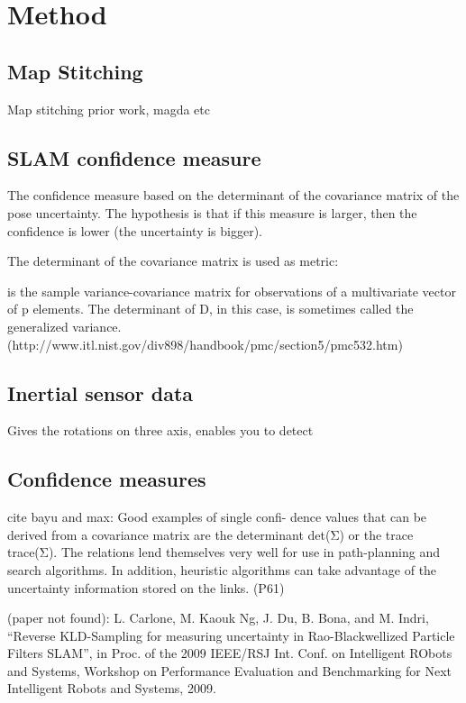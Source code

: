 \chapter{Method}
\section{Map Stitching}
Map stitching prior work, magda etc

\section{SLAM confidence measure}
The confidence measure based on the determinant of the covariance matrix of the pose uncertainty. The hypothesis is that if this measure is larger, then the confidence is lower (the uncertainty is bigger).

The determinant of the covariance matrix is used as metric:

is the sample variance-covariance matrix for observations of a multivariate vector of p elements. The determinant of D, in this case, is sometimes called the generalized variance. (http://www.itl.nist.gov/div898/handbook/pmc/section5/pmc532.htm)

\section{Inertial sensor data}
Gives the rotations on three axis, enables you to detect 

\section{Confidence measures}
cite bayu and max:     Good examples of single confi- dence values that can be derived from a covariance matrix are the determinant det(Σ) or the trace trace(Σ). The relations lend themselves very well for use in path-planning and search algorithms. In addition, heuristic algorithms can take advantage of the uncertainty information stored on the links. (P61)


(paper not found): L. Carlone, M. Kaouk Ng, J. Du, B. Bona, and M. Indri, “Reverse KLD-Sampling for measuring uncertainty in Rao-Blackwellized Particle Filters SLAM”, in Proc. of the 2009 IEEE/RSJ Int. Conf. on Intelligent RObots and Systems, Workshop on Performance Evaluation and Benchmarking for Next Intelligent Robots and Systems, 2009.

